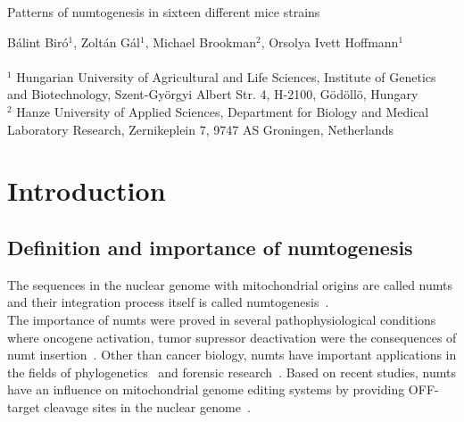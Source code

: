 \documentclass[a4paper,12pt]{article}
\numberwithin{equation}{section} %
\begin{document}
\begin{center}
	\Large{Patterns of numtogenesis in sixteen different mice strains}
\end{center}
\small{Bálint Biró$^1$, Zoltán Gál$^1$, Michael Brookman$^2$, Orsolya Ivett Hoffmann$^1$}\\ \\
\scriptsize{$^1$ Hungarian University of Agricultural and Life Sciences, Institute of Genetics and Biotechnology, Szent-Györgyi Albert Str. 4, H-2100, Gödöllö, Hungary\\
$^2$ Hanze University of Applied Sciences, Department for Biology and Medical Laboratory Research, Zernikeplein 7, 9747 AS Groningen, Netherlands}

\normalsize
\section{Introduction}
\subsection{Definition and importance of numtogenesis}
\indent The sequences in the nuclear genome with mitochondrial origins are called numts and their integration process itself is called numtogenesis~. \\ \indent The importance of numts were proved in several pathophysiological conditions where oncogene activation, tumor supressor deactivation were the consequences of numt insertion~. Other than cancer biology, numts have important applications in the fields of phylogenetics~ and forensic research~. Based on recent studies, numts have an influence on mitochondrial genome editing systems by providing OFF-target cleavage sites in the nuclear genome~.
\end{document}
